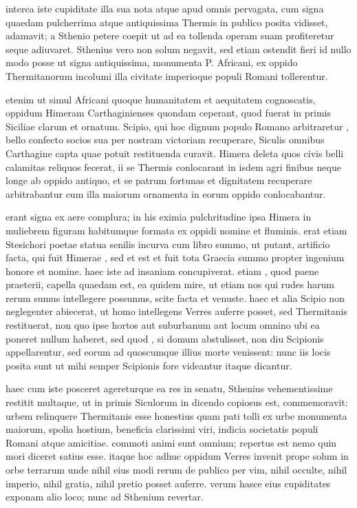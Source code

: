  interea iste cupiditate illa sua nota atque apud omnis pervagata, cum signa quaedam pulcherrima atque antiquissima Thermis in publico posita vidisset, adamavit; a Sthenio petere coepit ut ad ea tollenda operam suam profiteretur seque adiuvaret. Sthenius vero non solum negavit, sed etiam ostendit fieri id nullo modo posse ut signa antiquissima, monumenta P. Africani, ex oppido Thermitanorum incolumi illa civitate imperioque populi Romani tollerentur.

 etenim ut simul Africani quoque humanitatem et aequitatem cognoscatis, oppidum Himeram Carthaginienses quondam ceperant, quod fuerat in primis Siciliae clarum et ornatum. Scipio, qui hoc dignum populo Romano arbitraretur , bello confecto socios sua per nostram victoriam recuperare, Siculis omnibus Carthagine capta quae potuit restituenda curavit. Himera deleta quos civis belli calamitas reliquos fecerat, ii se Thermis conlocarant in isdem agri finibus neque longe ab oppido antiquo, et se patrum fortunas et dignitatem recuperare arbitrabantur cum illa maiorum ornamenta in eorum oppido conlocabantur.

 erant signa ex aere complura; in his eximia pulchritudine ipsa Himera in muliebrem figuram habitumque formata ex oppidi nomine et fluminis. erat etiam Stesichori poetae statua senilis incurva cum libro summo, ut putant, artificio facta, qui fuit Himerae , sed et est et fuit tota Graecia summo propter ingenium honore et nomine. haec iste ad insaniam concupiverat. etiam , quod paene praeterii, capella quaedam est, ea quidem mire, ut etiam nos qui rudes harum rerum sumus intellegere possumus, scite facta et venuste. haec et alia Scipio non neglegenter abiecerat, ut homo intellegens Verres auferre posset, sed Thermitanis restituerat, non quo ipse hortos aut suburbanum aut locum omnino ubi ea poneret nullum haberet, sed quod , si domum abstulisset, non diu Scipionis appellarentur, sed eorum ad quoscumque illius morte venissent: nunc iis locis posita sunt ut mihi semper Scipionis fore videantur itaque dicantur.

 haec cum iste posceret agereturque ea res in senatu, Sthenius vehementissime restitit multaque, ut in primis Siculorum in dicendo copiosus est, commemoravit: urbem relinquere Thermitanis esse honestius quam pati tolli ex urbe monumenta maiorum, spolia hostium, beneficia clarissimi viri, indicia societatis populi Romani atque amicitiae. commoti animi sunt omnium; repertus est nemo quin mori diceret satius esse. itaque hoc adhuc oppidum Verres invenit prope solum in orbe terrarum unde nihil eius modi rerum de publico per vim, nihil occulte, nihil imperio, nihil gratia, nihil pretio posset auferre. verum hasce eius cupiditates exponam alio loco; nunc ad Sthenium revertar.

